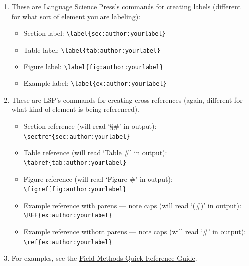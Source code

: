 \documentclass[output=paper,colorlinks,citecolor=brown]{langscibook}
\begin{document}
\begin{enumerate}    

\item These are Language Science Press's commands for creating labels (different for what sort of element you are labeling): 

\begin{itemize}

\item Section label: \verb|\label{sec:author:yourlabel}|

\item Table label: \verb|\label{tab:author:yourlabel}|

\item Figure label: \verb|\label{fig:author:yourlabel}|

\item Example label: \verb|\label{ex:author:yourlabel}|

\end{itemize}
    
    
\item These are LSP's commands for creating cross-references (again, different for what kind of element is being referenced). 

\begin{itemize}

\item Section reference (will read `\S \#’ in output):\\ \verb|\sectref{sec:author:yourlabel}|

\item Table reference (will read `Table \#’ in output):\\ \verb|\tabref{tab:author:yourlabel}|

\item Figure reference (will read `Figure \#’ in output): \\ \verb|\figref{fig:author:yourlabel}|

\item Example reference with parens — note caps (will read `(\#)’ in output): \\ \verb|\REF{ex:author:yourlabel}| 

\item Example reference without parens — note caps (will read `\#’ in output): \\ \verb|\ref{ex:author:yourlabel}|

\end{itemize}

\item For examples, see the \href{https://www.overleaf.com/latex/templates/field-methods-papers-quick-reference-guide/cqbjxwnffvrm}{Field Methods Quick Reference  Guide}.

\end{enumerate}
\end{document}
